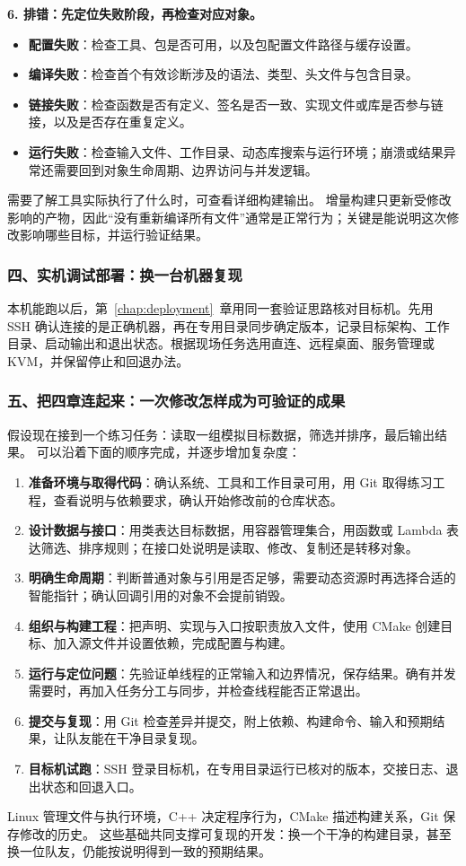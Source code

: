 \textbf{6. 排错：先定位失败阶段，再检查对应对象。}
\begin{itemize}
    \item \textbf{配置失败}：检查工具、包是否可用，以及包配置文件路径与缓存设置。
    \item \textbf{编译失败}：检查首个有效诊断涉及的语法、类型、头文件与包含目录。
    \item \textbf{链接失败}：检查函数是否有定义、签名是否一致、实现文件或库是否参与链接，以及是否存在重复定义。
    \item \textbf{运行失败}：检查输入文件、工作目录、动态库搜索与运行环境；崩溃或结果异常还需要回到对象生命周期、边界访问与并发逻辑。
\end{itemize}
需要了解工具实际执行了什么时，可查看详细构建输出。
增量构建只更新受修改影响的产物，因此“没有重新编译所有文件”通常是正常行为；关键是能说明这次修改影响哪些目标，并运行验证结果。

\subsubsection*{四、实机调试部署：换一台机器复现}

本机能跑以后，第~\ref{chap:deployment}~章用同一套验证思路核对目标机。先用 SSH 确认连接的是正确机器，再在专用目录同步确定版本，记录目标架构、工作目录、启动输出和退出状态。根据现场任务选用直连、远程桌面、服务管理或 KVM，并保留停止和回退办法。

\subsubsection*{五、把四章连起来：一次修改怎样成为可验证的成果}

假设现在接到一个练习任务：读取一组模拟目标数据，筛选并排序，最后输出结果。
可以沿着下面的顺序完成，并逐步增加复杂度：
\begin{enumerate}
    \item \textbf{准备环境与取得代码}：确认系统、工具和工作目录可用，用 Git 取得练习工程，查看说明与依赖要求，确认开始修改前的仓库状态。
    \item \textbf{设计数据与接口}：用类表达目标数据，用容器管理集合，用函数或 Lambda 表达筛选、排序规则；在接口处说明是读取、修改、复制还是转移对象。
    \item \textbf{明确生命周期}：判断普通对象与引用是否足够，需要动态资源时再选择合适的智能指针；确认回调引用的对象不会提前销毁。
    \item \textbf{组织与构建工程}：把声明、实现与入口按职责放入文件，使用 CMake 创建目标、加入源文件并设置依赖，完成配置与构建。
    \item \textbf{运行与定位问题}：先验证单线程的正常输入和边界情况，保存结果。确有并发需要时，再加入任务分工与同步，并检查线程能否正常退出。
    \item \textbf{提交与复现}：用 Git 检查差异并提交，附上依赖、构建命令、输入和预期结果，让队友能在干净目录复现。
    \item \textbf{目标机试跑}：SSH 登录目标机，在专用目录运行已核对的版本，交接日志、退出状态和回退入口。
\end{enumerate}
Linux 管理文件与执行环境，C++ 决定程序行为，CMake 描述构建关系，Git 保存修改的历史。
这些基础共同支撑可复现的开发：换一个干净的构建目录，甚至换一位队友，仍能按说明得到一致的预期结果。

